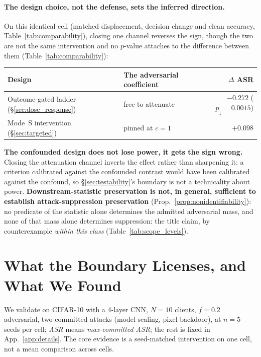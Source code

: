 \documentclass{article}
\begin{document}
\paragraph{The design choice, not the defense, sets the inferred direction.} On this identical cell (matched displacement, decision change and clean accuracy, Table~\ref{tab:comparability}), closing one channel reverses the sign, though the two are not the same intervention and no $p$-value attaches to the difference between them (Table~\ref{tab:comparability}):

\begin{center}\small\vspace{-7pt}\setlength{\tabcolsep}{6pt}
\begin{tabular}{@{}llr@{}}
\toprule
Design & The adversarial coefficient & $\Delta$ ASR \\
\midrule
Outcome-gated ladder (\S\ref{sec:dose_response}) & free to attenuate & $-0.272$ ($p_{\downarrow}{=}0.0015$) \\
Mode~S intervention (\S\ref{sec:targeted}) & pinned at $c{=}1$ & $+0.098$ \\
\bottomrule
\end{tabular}
\vspace{-5pt}\end{center}

\noindent \textbf{The confounded design does not lose power, it gets the sign wrong.} Closing the attenuation channel inverts the effect rather than sharpening it: a criterion calibrated against the confounded contrast would have been calibrated against the confound, so \S\ref{sec:testability}'s boundary is not a technicality about power. \textbf{Downstream-statistic preservation is not, in general, sufficient to establish attack-suppression preservation} (Prop.~\ref{prop:nonidentifiability}): no predicate of the statistic alone determines the admitted adversarial mass, and none of that mass alone determines suppression: the title claim, by counterexample \emph{within this class} (Table~\ref{tab:scope_levels}).

\section{What the Boundary Licenses, and What We Found}
\label{sec:validation}
\label{sec:prospective}
\label{sec:metric_swap}

We validate on CIFAR-10 with a 4-layer CNN, $N{=}10$ clients, $f{=}0.2$ adversarial, two committed attacks (model-scaling, pixel backdoor), at $n{=}5$ seeds per cell; \emph{ASR} means \emph{max-committed ASR}; the rest is fixed in App.~\ref{app:details}. The core evidence is a seed-matched intervention on one cell, not a mean comparison across cells.
\end{document}
